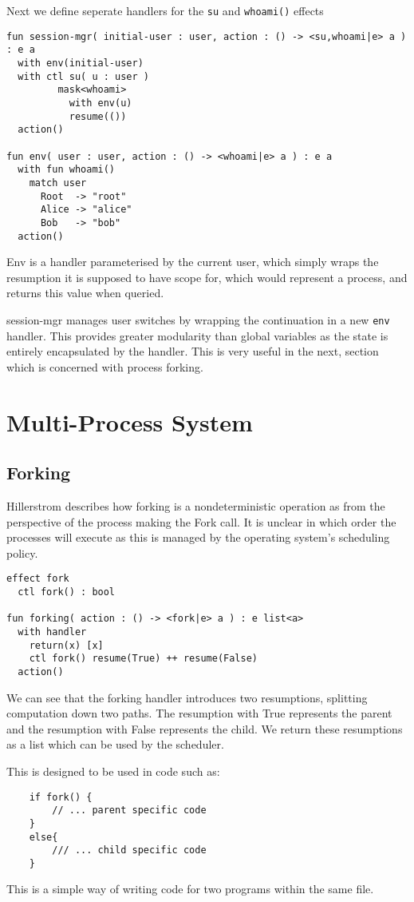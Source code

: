 \documentclass[logo,bsc,singlespacing,parskip]{infthesis}
\begin{document}
Next we define seperate handlers for the \texttt{su} and \texttt{whoami()} effects 
\begin{lstlisting}
fun session-mgr( initial-user : user, action : () -> <su,whoami|e> a ) : e a
  with env(initial-user)
  with ctl su( u : user )
         mask<whoami>
           with env(u)
           resume(())
  action()

fun env( user : user, action : () -> <whoami|e> a ) : e a
  with fun whoami() 
    match user
      Root  -> "root"
      Alice -> "alice"
      Bob   -> "bob"
  action()
\end{lstlisting}

Env is a handler parameterised by the current user, which simply wraps the resumption it is supposed to have scope for, which would represent a process, and returns this value when queried. 

session-mgr manages user switches by wrapping the continuation in a new \texttt{env} handler. This provides greater modularity than global variables as the state is entirely encapsulated by the handler. This is very useful in the next, section which is concerned with process forking.

\section{Multi-Process System}
\subsection*{Forking}
Hillerstrom describes how forking is a nondeterministic operation as from the perspective of the process making the Fork call. It is unclear in which order the processes will execute as this is managed by the operating system's scheduling policy. 

\begin{lstlisting}
effect fork
  ctl fork() : bool     

fun forking( action : () -> <fork|e> a ) : e list<a>
  with handler
    return(x) [x]
    ctl fork() resume(True) ++ resume(False)
  action()
\end{lstlisting}

We can see that the forking handler introduces two resumptions, splitting computation down two paths. The resumption with True represents the parent and the resumption with False represents the child. We return these resumptions as a list which can be used by the scheduler.

This is designed to be used in code such as:
\begin{lstlisting}
    if fork() {
        // ... parent specific code
    }
    else{
        /// ... child specific code
    }
\end{lstlisting}
This is a simple way of writing code for two programs within the same file.
\end{document}
